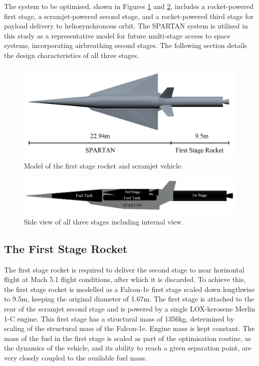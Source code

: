 \documentclass[journal]{new-aiaa}
\begin{document}
The system to be optimised, shown in Figures \ref{fig:NoInternal} and \ref{fig:INTERNALS}, includes a rocket-powered first stage, a scramjet-powered second stage, and a rocket-powered third stage for payload delivery to heliosynchronous orbit. The SPARTAN system\cite{Preller2015a,Jazra2013,Preller2017b}  is utilised in this study as a representative model for future multi-stage access to space systems, incorporating airbreathing second stages. The following section details the design characteristics of all three stages.

\begin{figure}[ht]
	\centering
	\includegraphics[width=.8\linewidth]{NoInternal}
	\caption{Model of the first stage rocket and scramjet vehicle.}
	\label{fig:NoInternal}
\end{figure}


\begin{figure}[ht]
	\centering
	\includegraphics[width=0.8\linewidth]{INTERNALS}
	\caption{Side view of all three stages including internal view.}
	\label{fig:INTERNALS}
\end{figure}

\subsection{The First Stage Rocket}




The first stage rocket is required to deliver the second stage to near horizontal flight at Mach 5.1 flight conditions, after which it is discarded. To achieve this, the first stage rocket is modelled as a Falcon-1e first stage scaled down lengthwise to 9.5m, keeping the original diameter of 1.67m\cite{Vehicle2008}. The first stage is attached to the rear of the scramjet second stage and is powered by a single LOX-kerosene Merlin 1-C engine.  This first stage has a structural mass of 1356kg, determined by scaling of the structural mass of the Falcon-1e. Engine mass is kept constant. The mass of the fuel in the first stage is scaled as part of the optimisation routine, as the dynamics of the vehicle, and its ability to reach a given separation point, are very closely coupled to the available fuel mass. 
\end{document}
